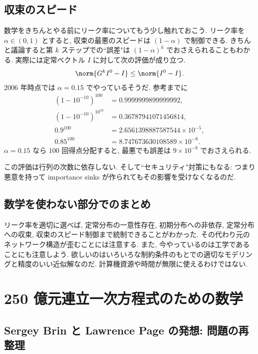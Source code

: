 \documentclass[openany, a4paper, oneside]{jsbook}
\begin{document}
\subsection{収束のスピード}

数学をきちんとやる前にリーク率についてもう少し触れておこう.
リーク率を $\alpha \in (0, 1)$ とすると,
収束の最悪のスピードは $(1-\alpha)$ で制御できる.
きちんと議論すると第 $k$ ステップでの``誤差"は $(1-\alpha)^k$ でおさえられることもわかる.
実際には定常ベクトル $I$ に対して次の評価が成り立つ.
\begin{align}
 \norm{G^k I^0 - I}
 \leq
 \norm{I^0 - I}.
\end{align}
2006 年時点では $\alpha=0.15$ でやっているそうだ.
参考までに
\begin{align}
 (1-10^{-10})^{100}
 &=
 0.9999999899999992, \\
 (1-10^{-10})^{10^{10}}
 &=
 0.36787941071456814, \\
 0.9^{100}
 &=
 2.6561398887587544 \times 10^{-5}, \\
 0.85^{100}
 &=
 8.747673630108589 \times 10^{-8}.
\end{align}
$\alpha=0.15$ なら $100$ 回得点分配すると,
最悪でも誤差は $9 \times 10^{-8}$ でおさえられる.
\begin{rem}[ごまかしのご利益]
この評価は行列の次数に依存しない.
そして``セキュリティ"対策にもなる: つまり悪意を持って importance sinks が作られてもその影響を受けなくなるのだ.
\end{rem}
\subsection{数学を使わない部分でのまとめ}

リーク率を適切に選べば, 定常分布の一意性存在, 初期分布への非依存, 定常分布への収束,
収束のスピード制御まで統制できることがわかった.
その代わり元のネットワーク構造が歪むことには注意する.
また, 今やっているのは工学であることにも注意しよう.
欲しいのはいろいろな制約条件のもとでの適切なモデリングと精度のいい近似解なのだ.
計算機資源や時間が無限に使えるわけではない.
\section{250 億元連立一次方程式のための数学}

\subsection{Sergey Brin と Lawrence Page の発想: 問題の再整理}
\end{document}
